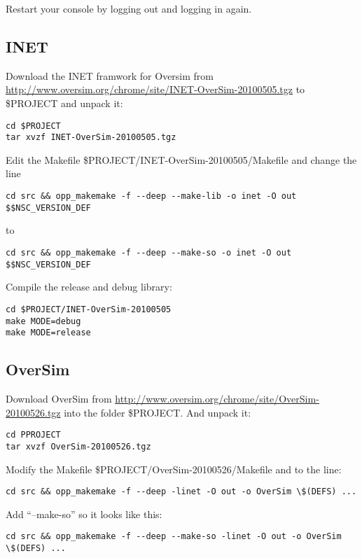 \documentclass[a4paper,10pt]{article}
\begin{document}
Restart your console by logging out and logging in again.

\subsection{INET}

Download the INET framwork for Oversim from \href{http://www.oversim.org/chrome/site/INET-OverSim-20100505.tgz}{http://www.oversim.org/chrome/site/INET-OverSim-20100505.tgz} to \$PROJECT and unpack it:
\begin{lstlisting}
cd $PROJECT
tar xvzf INET-OverSim-20100505.tgz
\end{lstlisting}

Edit the Makefile \$PROJECT/INET-OverSim-20100505/Makefile and change the line
\begin{lstlisting}
cd src && opp_makemake -f --deep --make-lib -o inet -O out $$NSC_VERSION_DEF
\end{lstlisting}
to
\begin{lstlisting}
cd src && opp_makemake -f --deep --make-so -o inet -O out $$NSC_VERSION_DEF
\end{lstlisting}

Compile the release and debug library:
\begin{lstlisting}
cd $PROJECT/INET-OverSim-20100505
make MODE=debug
make MODE=release
\end{lstlisting}

\subsection{OverSim}

Download OverSim from \href{http://www.oversim.org/chrome/site/OverSim-20100526.tgz}{http://www.oversim.org/chrome/site/OverSim-20100526.tgz} into the folder \$PROJECT. And unpack it:
\begin{lstlisting}
cd PPROJECT
tar xvzf OverSim-20100526.tgz
\end{lstlisting}

Modify the Makefile \$PROJECT/OverSim-20100526/Makefile and to the line:
\begin{lstlisting}
cd src && opp_makemake -f --deep -linet -O out -o OverSim \$(DEFS) ...
\end{lstlisting}
Add "`--make-so"' so it looks like this:
\begin{lstlisting}
cd src && opp_makemake -f --deep --make-so -linet -O out -o OverSim \$(DEFS) ...
\end{lstlisting}
\end{document}
